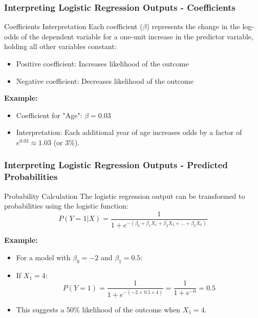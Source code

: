 \documentclass[aspectratio=169]{beamer}
\begin{document}
\begin{frame}[fragile]
    \frametitle{Interpreting Logistic Regression Outputs - Coefficients}
    \begin{block}{Coefficients Interpretation}
        Each coefficient (\( \beta \)) represents the change in the log-odds of the dependent variable for a one-unit increase in the predictor variable, holding all other variables constant:
        \begin{itemize}
            \item Positive coefficient: Increases likelihood of the outcome
            \item Negative coefficient: Decreases likelihood of the outcome
        \end{itemize}
    \end{block}
    
    \textbf{Example:}
    \begin{itemize}
        \item Coefficient for "Age": \( \beta = 0.03 \)
        \item Interpretation: Each additional year of age increases odds by a factor of \( e^{0.03} \approx 1.03 \) (or 3\%).
    \end{itemize}
\end{frame}

\begin{frame}[fragile]
    \frametitle{Interpreting Logistic Regression Outputs - Predicted Probabilities}
    \begin{block}{Probability Calculation}
        The logistic regression output can be transformed to probabilities using the logistic function:
        \begin{equation}
            P(Y=1 | X) = \frac{1}{1 + e^{-(\beta_0 + \beta_1 X_1 + \beta_2 X_2 + \ldots + \beta_k X_k)}}
        \end{equation}
    \end{block}

    \textbf{Example:}
    \begin{itemize}
        \item For a model with \( \beta_0 = -2 \) and \( \beta_1 = 0.5 \):
        \item If \( X_1 = 4 \):
        \begin{equation}
            P(Y=1) = \frac{1}{1 + e^{-(-2 + 0.5 \times 4)}} = \frac{1}{1 + e^{-0}} = 0.5
        \end{equation}
        \item This suggests a 50\% likelihood of the outcome when \( X_1 = 4 \).
    \end{itemize}
\end{frame}
\end{document}
